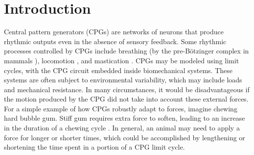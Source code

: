 \documentclass[12pt]{article}
\begin{document}
\pagestyle{headings}
\section{Introduction}

 Central pattern generators (CPGs) are networks of neurons that produce rhythmic outputs even in the absence of sensory feedback.  Some rhythmic processes controlled by CPGs include breathing (by the pre-B\"{o}tzinger complex in mammals \cite{Butera+Rinzel+Smith:1999a:JNPhys,Butera+Rinzel+Smith:1999b:JNPhys}), locomotion \cite{CohenErmentroutKiemelKopellSigvardtWilliams:1992:TrendsNsci,SpardyEtAlRubin2011a,SpardyEtAlRubin2011b}, and mastication \cite{LundKolta:2006}.  CPGs may be modeled using limit cycles, with the CPG circuit embedded inside biomechanical systems.  These systems are often subject to environmental variability, which may include loads and mechanical resistance.  In many circumstances, it would be disadvantageous if the motion produced by the CPG did not take into account these external forces.  For a simple example of how CPGs robustly adapt to forces, imagine chewing hard bubble gum.  Stiff gum requires extra force to soften, leading to an increase in the duration of a chewing cycle \cite{Plesh1986}.  
 In general, an animal may need to apply a force for longer or shorter times, which could be accomplished by lengthening or shortening the time spent in a portion of a CPG limit cycle.  %
 
\end{document}
